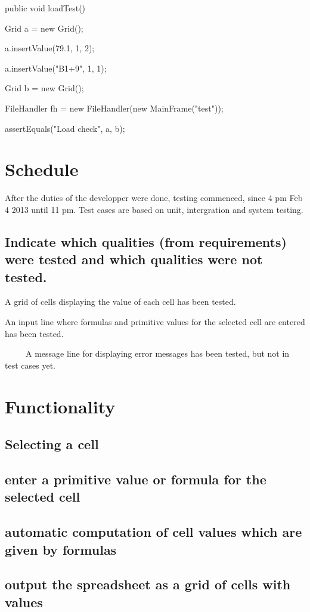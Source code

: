 \documentclass[12pt]{article}
\begin{document}
	public void loadTest() 

Grid a = new Grid();

a.insertValue(79.1, 1, 2);

a.insertValue("B1+9", 1, 1);

Grid b = new Grid();

FileHandler fh = new FileHandler(new MainFrame("test"));

assertEquals("Load check", a, b);

 \section{Schedule}
After the duties of the developper were done, testing commenced, since 4 pm Feb 4 2013 until 11 pm.  Test cases are based on unit, intergration and system testing.



\subsection{Indicate which qualities (from requirements) were tested and which qualities were not tested.}
A grid of cells displaying the value of each cell has been tested.

An input line where formulas and primitive values for the selected cell are entered has been tested.

~~~~~A message line for displaying error messages has been tested, but not in test cases yet.~~~~~


\section{Functionality}

\subsection{Selecting a cell}
\subsection{enter a primitive value or formula for the selected cell }
\subsection{ automatic computation of cell values which are given by formulas} 
\subsection{ output the spreadsheet as a grid of cells with values }
\end{document}
